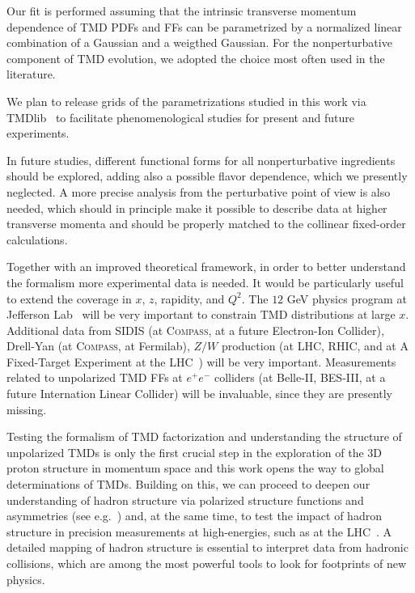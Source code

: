\documentclass[aps,preprintnumbers,showpacs,nofootinbib,superscriptaddress,floatfix]{revtex4}
\newcommand{\AS}[1]{{\textcolor[rgb]{1,0,1}{#1}}}
\newcommand{\compass}{\textsc{Compass}}
\begin{document}
Our fit is performed assuming that the intrinsic transverse momentum
dependence of TMD PDFs and FFs 
can be parametrized by a normalized linear combination of a Gaussian and a
weigthed Gaussian. 
For the nonperturbative component of TMD evolution, we adopted the choice most
often used in the literature. 

We plan to release grids of the parametrizations studied in this work via
TMDlib~\cite{Hautmann:2014kza} to facilitate phenomenological studies for
present and future experiments. 

In future studies, different
functional forms for all nonperturbative ingredients should be explored, 
adding also a possible
flavor dependence, which we presently neglected.
A more
precise analysis from the perturbative point of view is also needed, which
should in principle make it possible to describe data at higher transverse
momenta and 
should be properly matched to 
the collinear fixed-order calculations. 

Together with an improved theoretical framework, in order to better understand
the formalism more experimental data is needed. It would be particularly
useful to extend the
coverage in $x$, $z$, rapidity, and $Q^2$.  
The $12$ GeV physics program at Jefferson Lab~\cite{Dudek:2012vr} will be very important to constrain TMD distributions at large $x$.
Additional data from SIDIS (at \compass, at a future Electron-Ion
Collider), Drell-Yan (at \compass, at Fermilab), 
$Z/W$ production (at LHC, RHIC, and at
A Fixed-Target Experiment at the \AS{LHC~\cite{Brodsky:2012vg}}) will be very important. Measurements
related to unpolarized
TMD FFs at $e^+e^-$ colliders (at Belle-II, BES-III, at a
future Internation Linear Collider) will be invaluable, since they are
presently missing.

Testing the formalism of TMD factorization and understanding the structure of unpolarized TMDs is only the first crucial step in the exploration of the 3D proton structure in momentum space and this work opens the way to global determinations of TMDs. 
Building on this, we can proceed to deepen our understanding of hadron structure via \AS{polarized structure functions and asymmetries} (see e.g.~\cite{Aschenauer:2015ndk,Boglione:2015zyc,Kikola:2017hnp}) and, at the same time, to test the impact of hadron structure in precision measurements at high-energies, such as at the \AS{LHC~\cite{Signori:2016lvd}}. A detailed mapping of hadron structure is essential to interpret data from hadronic collisions, which are among the most powerful tools to look for footprints of new physics.
\end{document}
